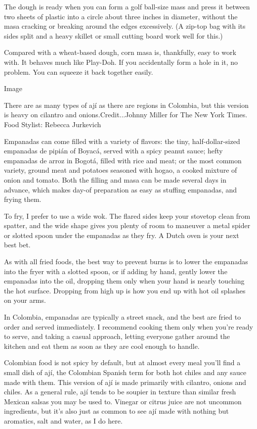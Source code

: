 The dough is ready when you can form a golf ball-size mass and press it
between two sheets of plastic into a circle about three inches in
diameter, without the masa cracking or breaking around the edges
excessively. (A zip-top bag with its sides split and a heavy skillet or
small cutting board work well for this.)

Compared with a wheat-based dough, corn masa is, thankfully, easy to
work with. It behaves much like Play-Doh. If you accidentally form a
hole in it, no problem. You can squeeze it back together easily.

Image

There are as many types of ají as there are regions in Colombia, but
this version is heavy on cilantro and onions.Credit...Johnny Miller for
The New York Times. Food Stylist: Rebecca Jurkevich

Empanadas can come filled with a variety of flavors: the tiny,
half-dollar-sized empanadas de pipián of Boyacá, served with a spicy
peanut sauce; hefty empanadas de arroz in Bogotá, filled with rice and
meat; or the most common variety, ground meat and potatoes seasoned with
hogao, a cooked mixture of onion and tomato. Both the filling and masa
can be made several days in advance, which makes day-of preparation as
easy as stuffing empanadas, and frying them.

To fry, I prefer to use a wide wok. The flared sides keep your stovetop
clean from spatter, and the wide shape gives you plenty of room to
maneuver a metal spider or slotted spoon under the empanadas as they
fry. A Dutch oven is your next best bet.

As with all fried foods, the best way to prevent burns is to lower the
empanadas into the fryer with a slotted spoon, or if adding by hand,
gently lower the empanadas into the oil, dropping them only when your
hand is nearly touching the hot surface. Dropping from high up is how
you end up with hot oil splashes on your arms.

In Colombia, empanadas are typically a street snack, and the best are
fried to order and served immediately. I recommend cooking them only
when you're ready to serve, and taking a casual approach, letting
everyone gather around the kitchen and eat them as soon as they are cool
enough to handle.

Colombian food is not spicy by default, but at almost every meal you'll
find a small dish of ají, the Colombian Spanish term for both hot chiles
and any sauce made with them. This version of ají is made primarily with
cilantro, onions and chiles. As a general rule, ají tends to be soupier
in texture than similar fresh Mexican salsas you may be used to. Vinegar
or citrus juice are not uncommon ingredients, but it's also just as
common to see ají made with nothing but aromatics, salt and water, as I
do here.

